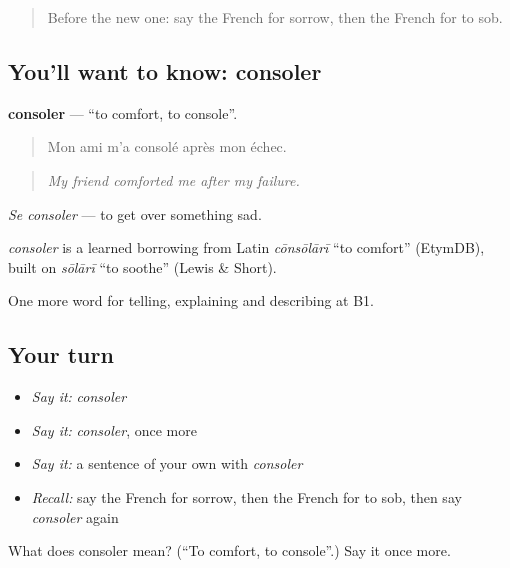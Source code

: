 \label{lesson:FR-C471-consoler}



\begin{quote}
Before the new one: say the French for sorrow, then the French for to sob.
\end{quote}

\subsection*{You'll want to know: consoler}
\textbf{consoler} — \textquotedblleft{}to comfort, to console\textquotedblright{}.

\begin{quote}
Mon ami m'a consolé après mon échec.
\end{quote}

\begin{quote}
\emph{My friend comforted me after my failure.}
\end{quote}

\emph{Se consoler} — to get over something sad.

\begin{cousinweb}
\emph{consoler} is a learned borrowing from Latin \emph{cōnsōlārī} \textquotedblleft{}to comfort\textquotedblright{} (EtymDB), built on \emph{sōlārī} \textquotedblleft{}to soothe\textquotedblright{} (Lewis \& Short).
\end{cousinweb}

\begin{grammarlens}[title={What you've built}]
One more word for telling, explaining and describing at B1.
\end{grammarlens}

\subsection*{Your turn}
\begin{itemize}
\raggedright
  \item \emph{Say it:} \emph{consoler}
  \item \emph{Say it:} \emph{consoler}, once more
  \item \emph{Say it:} a sentence of your own with \emph{consoler}
  \item \emph{Recall:} say the French for sorrow, then the French for to sob, then say \emph{consoler} again
\end{itemize}

\begin{tcolorbox}[breakable,colback=teal!4,colframe=teal!35!black,title={Before you move on}]
What does consoler mean? (\textquotedblleft{}To comfort, to console\textquotedblright{}.) Say it once more.
\end{tcolorbox}
